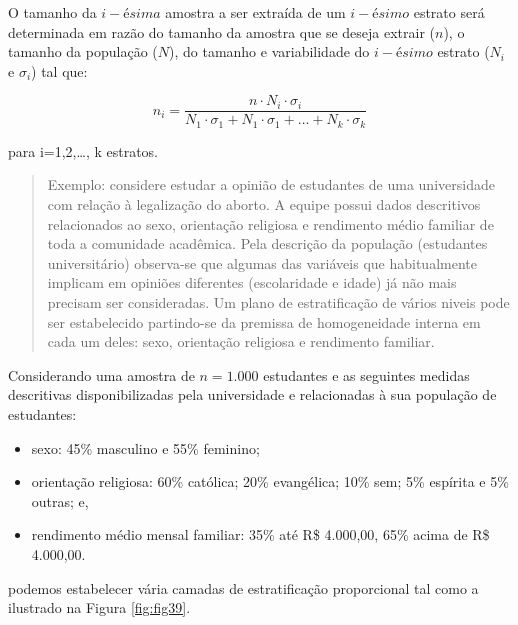 \documentclass[
]{book}
\providecommand{\tightlist}{%
  \setlength{\itemsep}{0pt}\setlength{\parskip}{0pt}}
\begin{document}
\hfill\break

O tamanho da \(i-ésima\) amostra a ser extraída de um \(i-ésimo\) estrato será determinada em razão do tamanho da amostra que se deseja extrair (\(n\)), o tamanho da população (\(N\)), do tamanho e variabilidade do \(i-ésimo\) estrato (\(N_{i}\) e \(\sigma_{i}\)) tal que:

\hfill\break

\[
n_{i} =\frac{ n \cdot N_{i} \cdot \sigma_{i} }{ N_{1} \cdot \sigma_{1} + N_{1} \cdot \sigma_{1} + \dots+ N_{k} \cdot \sigma_{k}}
\]

para i=1,2,\ldots, k estratos.

\hfill\break

\begin{quote}
Exemplo: considere estudar a opinião de estudantes de uma universidade com relação à legalização do aborto. A equipe possui dados descritivos relacionados ao sexo, orientação religiosa e rendimento médio familiar de toda a comunidade acadêmica.
Pela descrição da população (estudantes universitário) observa-se que algumas das variáveis que habitualmente implicam em opiniões diferentes (escolaridade e idade) já não mais precisam ser consideradas.
Um plano de estratificação de vários niveis pode ser estabelecido partindo-se da premissa de homogeneidade interna em cada um deles: sexo, orientação religiosa e rendimento familiar.
\end{quote}

\hfill\break

Considerando uma amostra de \(n=1.000\) estudantes e as seguintes medidas descritivas disponibilizadas pela universidade e relacionadas à sua população de estudantes:

\hfill\break

\begin{itemize}
\tightlist
\item
  sexo: 45\% masculino e 55\% feminino;\\
\item
  orientação religiosa: 60\% católica; 20\% evangélica; 10\% sem; 5\% espírita e 5\% outras; e,\\
\item
  rendimento médio mensal familiar: 35\% até R\$ 4.000,00, 65\% acima de R\$ 4.000,00.
\end{itemize}

\hfill\break

podemos estabelecer vária camadas de estratificação proporcional tal como a ilustrado na Figura \ref{fig:fig39}.
\end{document}
